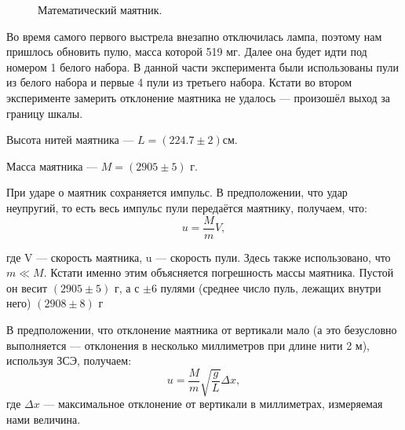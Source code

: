 \documentclass[a4paper, 12pt]{article}%
\begin{document}
\begin{figure}[h!]
\caption{Математический маятник.}
\end{figure}

Во время самого первого выстрела внезапно отключилась лампа, поэтому нам пришлось обновить пулю, масса которой 519 мг. Далее она будет идти под номером 1 белого набора. В данной части эксперимента были использованы пули из белого набора и первые 4 пули из третьего набора. Кстати во втором эксперименте замерить отклонение маятника не удалось --- произошёл выход за границу шкалы. 

Высота нитей маятника --- $L=(224.7\pm2)\text{см}$.

Масса маятника --- $M=(2905\pm5)\text{ г}$.

При ударе о маятник сохраняется импульс. В предположении, что удар неупругий, то есть весь импульс пули передаётся маятнику, получаем, что:
\begin{equation}
u=\frac{M}{m}V,
\end{equation}

где V --- скорость маятника, u --- скорость пули. Здесь также использовано, что $m\ll M$. Кстати именно этим объясняется погрешность массы маятника. Пустой он весит $(2905\pm5)\text{ г}$, а с $\pm6$ пулями (среднее число пуль, лежащих внутри него) $(2908\pm8)\text{ г}$

В предположении, что отклонение маятника от вертикали мало (а это безусловно выполняется --- отклонения в несколько миллиметров при длине нити 2 м), используя ЗСЭ, получаем:
\begin{equation}
u=\frac{M}{m}\sqrt{\frac{g}{L}}\Delta x,
\end{equation}
где $\Delta x$ --- максимальное отклонение от вертикали в миллиметрах, измеряемая нами величина.
\end{document}
